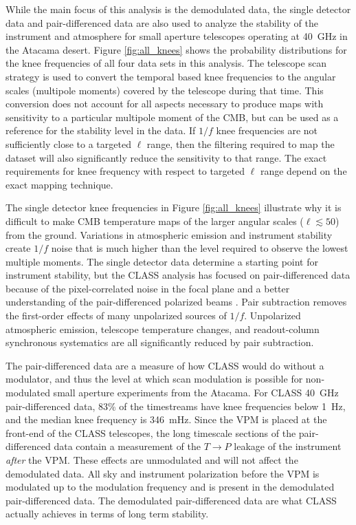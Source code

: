 \documentclass[twocolumn, tighten, numberedappendix, twocolappendix]{aastex63}
\begin{document}
While the main focus of this analysis is the demodulated data, the single detector data and pair-differenced data are also used to analyze the stability of the instrument and atmosphere for small aperture telescopes operating at 40~GHz in the Atacama desert. Figure \ref{fig:all_knees} shows the probability distributions for the knee frequencies of all four data sets in this analysis. The telescope scan strategy is used to convert the temporal based knee frequencies to the angular scales (multipole moments) covered by the telescope during that time. This conversion does not account for all aspects necessary to produce maps with sensitivity to a particular multipole moment of the CMB, but can be used as a reference for the stability level in the data. If $1/f$ knee frequencies are not sufficiently close to a targeted $\ell$ range, then the filtering required to map the dataset will also significantly reduce the sensitivity to that range. The exact requirements for knee frequency with respect to targeted $\ell$ range depend on the exact mapping technique.


The single detector knee frequencies in Figure \ref{fig:all_knees} illustrate why it is difficult to make CMB temperature maps of the larger angular scales ($\ell\lesssim50$) from the ground. Variations in atmospheric emission and instrument stability create $1/f$ noise that is much higher than the level required to observe the lowest multiple moments. The single detector data determine a starting point for instrument stability, but the CLASS analysis has focused on pair-differenced data because of the pixel-correlated noise in the focal plane \citep{appe19} and a better understanding of the pair-differenced polarized beams \citep{xu20}. Pair subtraction removes the first-order effects of many unpolarized sources of $1/f$. Unpolarized atmospheric emission, telescope temperature changes, and readout-column synchronous systematics are all significantly reduced by pair subtraction.  


The pair-differenced data are a measure of how CLASS would do without a modulator, and thus the level at which scan modulation is possible for non-modulated small aperture experiments from the Atacama. For CLASS 40~GHz pair-differenced data, 83\% of the timestreams have knee frequencies below 1~Hz, and the median knee frequency is 346~mHz. Since the VPM is placed at the front-end of the CLASS telescopes, the long timescale sections of the pair-differenced data contain a measurement of the $T\rightarrow P$ leakage of the instrument \textit{after} the VPM. These effects are unmodulated and will not affect the demodulated data. All sky and instrument polarization before the VPM is modulated up to the modulation frequency and is present in the demodulated pair-differenced data. The demodulated pair-differenced data are what CLASS actually achieves in terms of long term stability.
\end{document}
